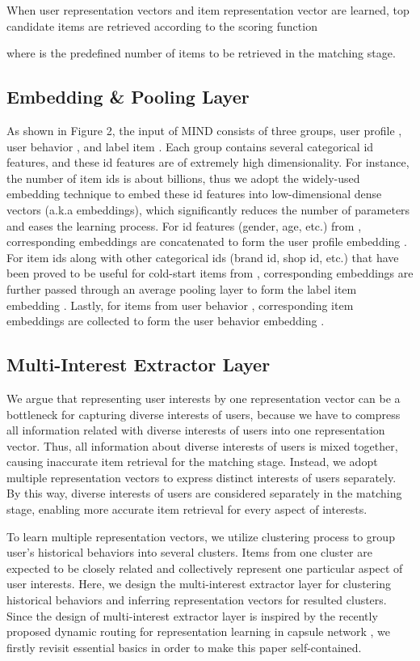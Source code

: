 \documentclass[sigconf]{acmart}
\begin{document}
When user representation vectors and item representation vector are learned, top  candidate items are retrieved according to the scoring function

where  is the predefined number of items to be retrieved in the matching stage.

\subsection{Embedding \& Pooling Layer}
As shown in Figure 2, the input of MIND consists of three groups, user profile , user behavior , and label item .
Each group contains several categorical id features, and these id features are of extremely high dimensionality.
For instance, the number of item ids is about billions, thus we adopt the widely-used embedding technique to embed these id features into low-dimensional dense vectors (a.k.a embeddings), which significantly reduces the number of parameters and eases the learning process.
For id features (gender, age, etc.) from , corresponding embeddings are concatenated to form the user profile embedding .
For item ids along with other categorical ids (brand id, shop id, etc.) that have been proved to be useful for cold-start items \cite{wang2018billion} from , corresponding embeddings are further passed through an average pooling layer to form the label item embedding .
Lastly, for items from user behavior , corresponding item embeddings are collected to form the user behavior embedding .

\subsection{Multi-Interest Extractor Layer}
We argue that representing user interests by one representation vector can be a bottleneck for capturing diverse interests of users, because we have to compress all information related with diverse interests of users into one representation vector.
Thus, all information about diverse interests of users is mixed together, causing inaccurate item retrieval for the matching stage.
Instead, we adopt multiple representation vectors to express distinct interests of users separately.
By this way, diverse interests of users are considered separately in the matching stage, enabling more accurate item retrieval for every aspect of interests.

To learn multiple representation vectors, we utilize clustering process to group user's historical behaviors into several clusters.
Items from one cluster are expected to be closely related and collectively represent one particular aspect of user interests.
Here, we design the multi-interest extractor layer for clustering historical behaviors and inferring representation vectors for resulted clusters.
Since the design of multi-interest extractor layer is inspired by the recently proposed dynamic routing for representation learning in capsule network \cite{hinton2011transforming,sabour2017dynamic,hinton2018matrix}, we firstly revisit essential basics in order to make this paper self-contained.
\end{document}

